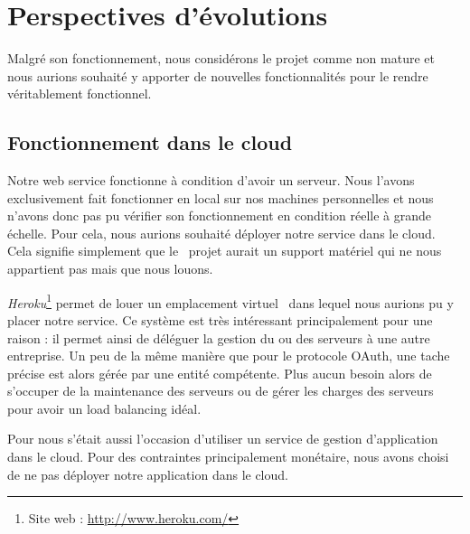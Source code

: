 \section{Perspectives d'évolutions}

Malgré son fonctionnement, nous considérons le projet comme non mature et nous aurions souhaité y apporter de
nouvelles fonctionnalités pour le rendre véritablement fonctionnel.




\subsection{Fonctionnement dans le cloud}

Notre web service fonctionne à condition d'avoir un serveur. Nous l'avons exclusivement fait fonctionner en local
sur nos machines personnelles et nous n'avons donc pas pu vérifier son fonctionnement en condition réelle à grande
échelle. Pour cela, nous aurions souhaité déployer notre service dans le cloud. Cela signifie simplement que le 
projet aurait un support matériel qui ne nous appartient pas mais que nous louons. 

\textit{Heroku}\footnote{Site web : \href{http://www.heroku.com/}{http://www.heroku.com/}} permet de louer un emplacement virtuel 
dans lequel nous aurions pu y placer notre service. Ce système est très intéressant principalement pour une raison : il permet ainsi de déléguer la gestion du ou des serveurs à une autre entreprise. Un peu de la même manière que pour
le protocole OAuth, une tache précise est alors gérée par une entité compétente. Plus aucun besoin alors de s'occuper
de la maintenance des serveurs ou de gérer les charges des serveurs pour avoir un load balancing idéal.

Pour nous s'était aussi l'occasion d'utiliser un service de gestion d'application dans le cloud. Pour des contraintes
principalement monétaire, nous avons choisi de ne pas déployer notre application dans le cloud.




